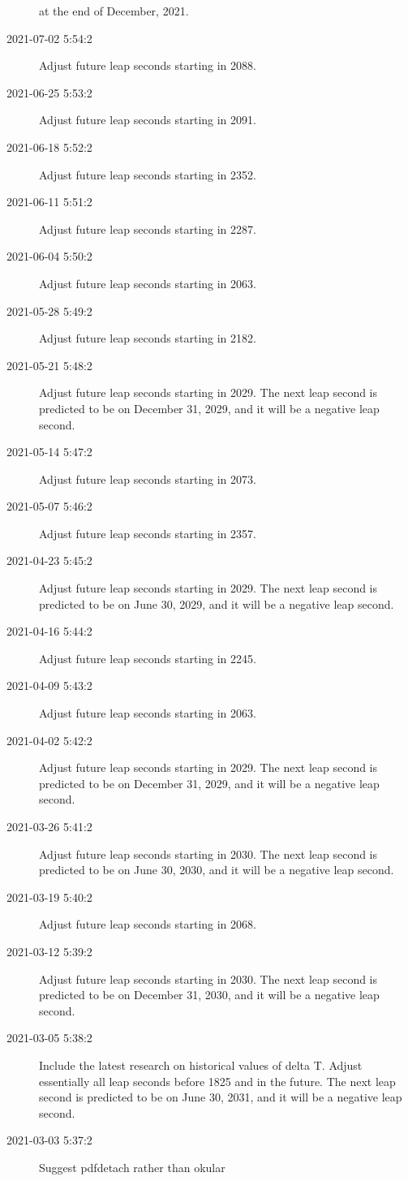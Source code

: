 \documentclass[letterpaper,twoside]{article}
\begin{document}
\begin{description}
  at the end of December, 2021.
\item[2021-07-02 5:54:2]Adjust future leap seconds starting in 2088.
\item[2021-06-25 5:53:2]Adjust future leap seconds starting in 2091.
\item[2021-06-18 5:52:2]Adjust future leap seconds starting in 2352.
\item[2021-06-11 5:51:2]Adjust future leap seconds starting in 2287.
\item[2021-06-04 5:50:2]Adjust future leap seconds starting in 2063.
\item[2021-05-28 5:49:2]Adjust future leap seconds starting in 2182.
\item[2021-05-21 5:48:2]Adjust future leap seconds starting in 2029.
  The next leap second is predicted to be on December 31, 2029, and
  it will be a negative leap second.
\item[2021-05-14 5:47:2]Adjust future leap seconds starting in 2073.
\item[2021-05-07 5:46:2]Adjust future leap seconds starting in 2357.
\item[2021-04-23 5:45:2]Adjust future leap seconds starting in 2029.
  The next leap second is predicted to be on June 30, 2029, and
  it will be a negative leap second.
\item[2021-04-16 5:44:2]Adjust future leap seconds starting in 2245.
\item[2021-04-09 5:43:2]Adjust future leap seconds starting in 2063.
\item[2021-04-02 5:42:2]Adjust future leap seconds starting in 2029.
  The next leap second is predicted to be on December 31, 2029, and
  it will be a negative leap second.
\item[2021-03-26 5:41:2]Adjust future leap seconds starting in 2030.
  The next leap second is predicted to be on June 30, 2030, and
  it will be a negative leap second.
\item[2021-03-19 5:40:2]Adjust future leap seconds starting in 2068.
\item[2021-03-12 5:39:2]Adjust future leap seconds starting in 2030.
  The next leap second is predicted to be on December 31, 2030,
  and it will be a negative leap second.
\item[2021-03-05 5:38:2]Include the latest research on historical values
  of delta T.  Adjust essentially all leap seconds before 1825 and
  in the future.  The next leap second is predicted to be on June 30, 2031,
  and it will be a negative leap second.
\item[2021-03-03 5:37:2]Suggest pdfdetach rather than okular

\end{description}
\end{document}
